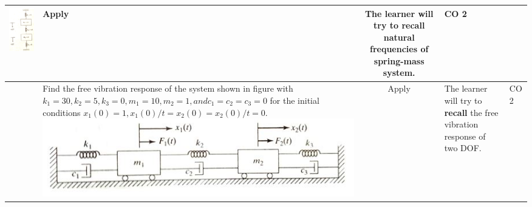 \documentclass[11pt,paper=a4,answers]{exam}
\begin{document}
\begin{flushleft}
\begin{longtable}{|>{\centering\arraybackslash}p{0.8cm}  | >{\raggedright\arraybackslash}p{6.5cm}  | c | >{\raggedright\arraybackslash}p{5cm} |>{\centering\arraybackslash}p{1cm}|}
	\includegraphics[scale=0.3]{1.jpg}
&	Apply&	The learner will try to \textbf{recall} natural frequencies of spring-mass system.&	CO 2\\
	\hline 
	2&	Find the free vibration response of the system shown in figure with $k_1=30, k_2=5, k_3=0, m_1=10, m_2=1, and c_1=c_2=c_3=0 $ for the initial conditions $ x_1(0)=1, x_1(0)/t=x_2(0)=x_2(0)/t=0 $. 
\includegraphics[scale=0.4]{2.jpg}
&	Apply&	The learner will try to \textbf{recall} the free vibration response of two DOF.&	CO 2\\

\end{longtable}
\end{flushleft}
\end{document}
